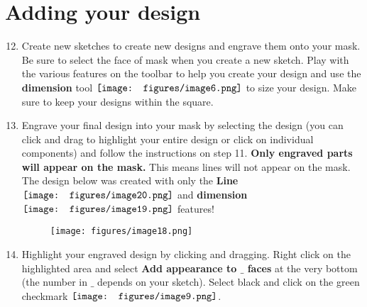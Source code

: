 \documentclass[12pt]{../manual}
\begin{document}
\section{Adding your design}
\begin{enumerate}
\setcounter{enumi}{11}
\item Create new sketches to create new designs and engrave them onto your mask. Be sure to select the face of mask when you create a new sketch. Play with the various features on the toolbar to help you create your design and use the {\bf dimension} tool $\vcenter{\hbox{\texttt{[image: figures/image6.png]}}}$ to size your design. Make sure to keep your designs within the square.
\item Engrave your final design into your mask by selecting the design (you can click and drag to highlight your entire design or click on individual components) and follow the instructions on step 11. {\bf Only engraved parts will appear on the mask.} This means lines will not appear on the mask. The design below was created with only the {\bf Line} $\vcenter{\hbox{\texttt{[image: figures/image20.png]}}}$  and {\bf dimension} $\vcenter{\hbox{\texttt{[image: figures/image19.png]}}}$ features!
\begin{figure}[ht!]
\centering
\texttt{[image: figures/image18.png]}
\end{figure}
\item Highlight your engraved design by clicking and dragging. Right click on the highlighted area and select {\bf Add appearance to $\_$ faces} at the very bottom (the number in $\_$ depends on your sketch). Select black and click on the green checkmark $\vcenter{\hbox{\texttt{[image: figures/image9.png]}}}$. 
\end{enumerate}
\newpage
\end{document}
